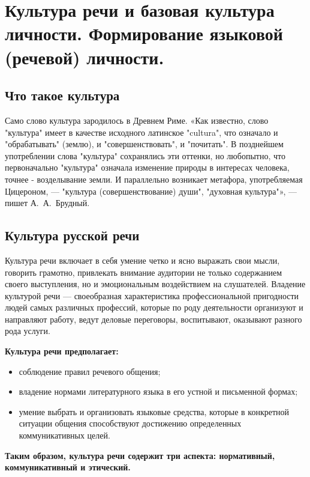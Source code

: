 \section{Культура речи и базовая культура личности. Формирование языковой (речевой) личности.}

\subsection*{Что такое культура}

Само слово культура зародилось в Древнем Риме. «Как известно, слово "культура" имеет в качестве исходного латинское "cultura", что означало и "обрабатывать" (землю), и "совершенствовать", и "почитать".
В позднейшем употреблении слова "культура" сохранялись эти оттенки, но любопытно, что первоначально "культура" означала изменение природы в интересах человека, точнее - возделывание земли.
И параллельно возникает метафора, употребляемая Цицероном, --- "культура (совершенствование) души", "духовная культура"», --- пишет А.~А.~Брудный.

\subsection*{Культура русской речи}
 

Культура речи включает в себя умение четко и ясно выражать свои мысли, говорить грамотно, привлекать внимание аудитории не только содержанием своего выступления, но и эмоциональным воздействием на слушателей.
Владение культурой речи --- своеобразная характеристика профессиональной пригодности людей самых различных профессий, которые по роду деятельности организуют и направляют работу, ведут деловые переговоры, воспитывают, оказывают разного рода услуги.

\textbf{Культура речи предполагает:}

\begin{itemize}
    \item соблюдение правил речевого общения;
    \item владение нормами литературного языка в его устной и письменной формах;
    \item умение выбрать и организовать языковые средства, которые в конкретной ситуации общения способствуют достижению определенных коммуникативных целей.
\end{itemize}

\textbf{Таким образом, культура речи содержит три аспекта: нормативный, коммуникативный и этический.}

